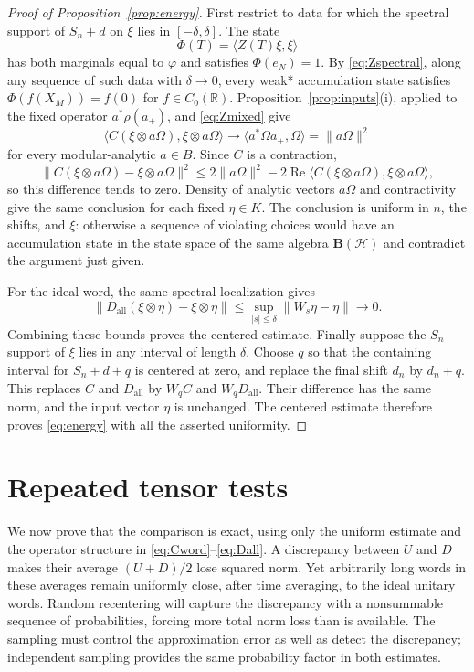 \documentclass[11pt]{article}
\theoremstyle{definition}
\newcommand{\R}{\mathbb R}
\newcommand{\HH}{\mathcal H}
\begin{document}
\begin{proof}[Proof of Proposition~\ref{prop:energy}]
First restrict to data for which the spectral support of $S_n+d$ on $\xi$
lies in $[-\delta,\delta]$. The state
\[
 \Phi(T)=\langle Z(T)\xi,\xi\rangle
\]
has both marginals equal to $\varphi$ and satisfies $\Phi(e_N)=1$. By
\eqref{eq:Zspectral}, along any sequence of such data with $\delta\to0$,
every weak* accumulation state satisfies
$\Phi(f(X_M))=f(0)$ for $f\in C_0(\R)$. Proposition~\ref{prop:inputs}(i),
applied to the fixed operator $a^*\rho(a_+)$, and \eqref{eq:Zmixed} give
\[
 \langle C(\xi\otimes a\Omega),\xi\otimes a\Omega\rangle
 \longrightarrow\langle a^*\Omega a_+,\Omega\rangle
 =\|a\Omega\|^2
\]
for every modular-analytic $a\in B$. Since $C$ is a contraction,
\[
 \|C(\xi\otimes a\Omega)-\xi\otimes a\Omega\|^2
 \le 2\|a\Omega\|^2
 -2\operatorname{Re}\langle C(\xi\otimes a\Omega),
                            \xi\otimes a\Omega\rangle,
\]
so this difference tends to zero. Density of analytic vectors $a\Omega$
and contractivity give the same conclusion for each fixed $\eta\in K$.
The conclusion is uniform in $n$, the shifts, and $\xi$: otherwise a
sequence of violating choices would have an accumulation state in the
state space of the same algebra $\mathbf B(\HH)$ and contradict the
argument just given.

For the ideal word, the same spectral localization gives
\[
 \|D_{\mathrm{all}}(\xi\otimes\eta)-\xi\otimes\eta\|
 \le\sup_{|s|\le\delta}\|W_s\eta-\eta\|\longrightarrow0.
\]
Combining these bounds proves the centered estimate. Finally suppose the
$S_n$-support of $\xi$ lies in any interval of length $\delta$. Choose $q$
so that the containing interval for $S_n+d+q$ is centered at zero, and replace
the final shift $d_n$ by $d_n+q$. This replaces $C$ and
$D_{\mathrm{all}}$ by $W_qC$ and $W_qD_{\mathrm{all}}$. Their difference
has the same norm, and the input vector $\eta$ is unchanged. The centered
estimate therefore proves \eqref{eq:energy} with all the asserted
uniformity.
\end{proof}
\section{Repeated tensor tests}\label{sec:repeat}
We now prove that the comparison is exact, using only the uniform estimate
and the operator structure in \eqref{eq:Cword}--\eqref{eq:Dall}.
A discrepancy between $U$ and $D$ makes their average $(U+D)/2$ lose squared
norm. Yet arbitrarily long words in these averages remain uniformly close,
after time averaging, to the ideal unitary words. Random recentering will
capture the discrepancy with a nonsummable sequence of probabilities,
forcing more total norm loss than is available.
The sampling must control the approximation error as well as detect the
discrepancy; independent sampling provides the same probability factor in both
estimates.
\end{document}
